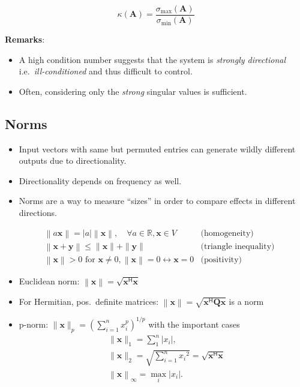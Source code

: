 \newpar{}
\noindent\begin{equation*}
    \kappa(\mathbf{A})=\frac{\sigma_{\max}(\mathbf{A})}{\sigma_{\min}(\mathbf{A})}
\end{equation*}

\textbf{Remarks}:
\begin{itemize}
    \item A high condition number suggests that the system is \textit{strongly directional} i.e.\ \textit{ill-conditioned} and thus difficult to control.
    \item Often, considering only the \textit{strong} singular values is sufficient.
\end{itemize}

\subsection{Norms}
\begin{itemize}
    \item Input vectors with same but permuted entries can generate wildly different outputs due to directionality.
    \item Directionality depends on frequency as well.
    \item Norms are a way to measure ``sizes'' in order to compare effects in different directions.
\end{itemize}

\begin{align*}
     & \left\| a\mathbf{x}\right\|  =\left|a\right|\left\|\mathbf{x}\right\|,\quad\forall a\in\mathbb{R},\mathbf{x}\in V                 & \text{(homogeneity)}         \\
     & \left\|\mathbf{x}+\mathbf{y}\right\|                         \leq\|\mathbf{x}\|+\|\mathbf{y}\|                                    & \text{(triangle inequality)} \\
     & \left\|\mathbf{x}\right\|                >0 \text{ for } \mathbf{x}\neq0, \left\|\mathbf{x}\right\|=0\leftrightarrow \mathbf{x}=0 & \text{(positivity)}
\end{align*}

\begin{itemize}
    \item Euclidean norm: $\left\|\mathbf{x}\right\|=\sqrt{\mathbf{x}^{\mathsf{H}}\mathbf{x}}$
    \item For Hermitian, pos.\ definite matrices: $\left\|\mathbf{x}\right\|=\sqrt{\mathbf{x}^{\mathsf{H}} \mathbf{Qx}}$ is a norm
    \item p-norm: $\|\mathbf{x}\|_p{=\left(\sum_{i=1}^n x_i^p\right)}^{1/p}$ with the important cases
          \begin{align*}
               & \|\mathbf{x}\|_1=\sum_1^n\left|x_i\right|,                                                 \\
               & \|\mathbf{x}\|_2=\sqrt{\sum_{i=1}^n {x_i}^2} = \sqrt{\mathbf{x}^{\mathsf{H}}\mathbf{x}   } \\
               & \left\|\mathbf{x}\right\|_\infty=\max_i\left|x_i\right|.
          \end{align*}
\end{itemize}

